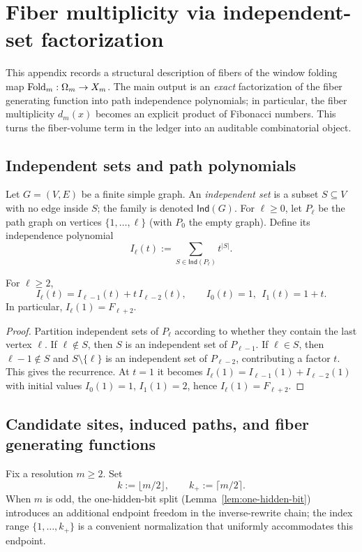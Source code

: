 \section{Fiber multiplicity via independent-set factorization}\label{app:fiber-multiplicity}

This appendix records a structural description of fibers of the window folding map $\mathrm{Fold}_m:\Omega_m\to X_m$.
The main output is an \emph{exact} factorization of the fiber generating function into path independence polynomials; in particular, the fiber multiplicity $d_m(x)$ becomes an explicit product of Fibonacci numbers.
This turns the fiber-volume term in the ledger into an auditable combinatorial object.

\subsection{Independent sets and path polynomials}\label{app:fiber-indset-prelim}
Let $G=(V,E)$ be a finite simple graph.
An \emph{independent set} is a subset $S\subseteq V$ with no edge inside $S$; the family is denoted $\mathsf{Ind}(G)$.
For $\ell\ge 0$, let $P_\ell$ be the path graph on vertices $\{1,\dots,\ell\}$ (with $P_0$ the empty graph).
Define its independence polynomial
\begin{equation}\label{eq:path-indset-poly}
I_\ell(t):=\sum_{S\in \mathsf{Ind}(P_\ell)} t^{|S|}.
\end{equation}

\begin{lemma}\label{lem:path-indset-rec}
For $\ell\ge 2$,
\[
I_\ell(t)=I_{\ell-1}(t)+t\,I_{\ell-2}(t),
\qquad
I_0(t)=1,\ \ I_1(t)=1+t.
\]
In particular, $I_\ell(1)=F_{\ell+2}$.
\end{lemma}
\begin{proof}
Partition independent sets of $P_\ell$ according to whether they contain the last vertex $\ell$.
If $\ell\notin S$, then $S$ is an independent set of $P_{\ell-1}$.
If $\ell\in S$, then $\ell-1\notin S$ and $S\setminus\{\ell\}$ is an independent set of $P_{\ell-2}$, contributing a factor $t$.
This gives the recurrence.
At $t=1$ it becomes $I_\ell(1)=I_{\ell-1}(1)+I_{\ell-2}(1)$ with initial values $I_0(1)=1$, $I_1(1)=2$, hence $I_\ell(1)=F_{\ell+2}$.
\end{proof}

\subsection{Candidate sites, induced paths, and fiber generating functions}\label{app:fiber-adm}
Fix a resolution $m\ge 2$.
Set
\[
k:=\lfloor m/2\rfloor,\qquad
k_{+}:=\lceil m/2\rceil.
\]
When $m$ is odd, the one-hidden-bit split (Lemma~\ref{lem:one-hidden-bit}) introduces an additional endpoint freedom in the inverse-rewrite chain; the index range $\{1,\dots,k_+\}$ is a convenient normalization that uniformly accommodates this endpoint.

